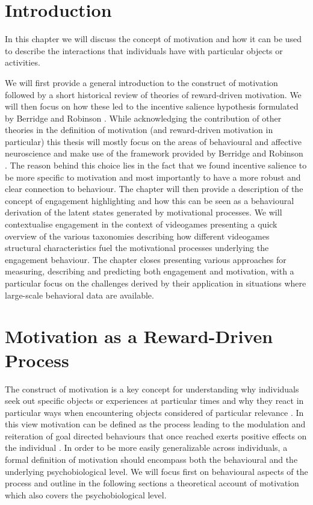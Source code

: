 \section{Introduction}
\label{motivation_engagement_introduction}
In this chapter we will discuss the concept of motivation and how it can be used to describe the interactions that individuals have with particular objects or activities. 

We will first provide a general introduction to the construct of motivation followed by a short historical review of theories of reward-driven motivation. We will then focus on how these led to the incentive salience hypothesis formulated by Berridge and Robinson \cite{berridge1998role}. While acknowledging the contribution of other theories in the definition of motivation (and reward-driven motivation in particular) this thesis will mostly focus on the areas of behavioural and affective neuroscience and make use of the framework provided by Berridge and Robinson \cite{berridge1998role}. The reason behind this choice lies in the fact that we found incentive salience to be more specific to motivation and most importantly to have a more robust and clear connection to behaviour. The chapter will then provide a description of the concept of engagement highlighting and how this can be seen as a behavioural derivation of the latent states generated by motivational processes. We will contextualise engagement in the context of videogames presenting a quick overview of the various taxonomies describing how different videogames structural characteristics fuel the motivational processes underlying the engagement behaviour. The chapter closes presenting various approaches for measuring, describing and predicting both engagement and motivation, with a particular focus on the challenges derived by their application in situations where large-scale behavioral data are available.

\section{Motivation as a Reward-Driven Process}
\label{motivation}
The construct of motivation is a key concept for understanding why individuals seek out specific objects or experiences at particular times and why they react in particular ways when encountering objects considered of particular relevance \cite{berridge2004motivation}. In this view motivation can be defined as the process leading to the modulation and reiteration of goal directed behaviours that once reached exerts positive effects on the individual \cite{simpson2016behavioral}. In order to be more easily generalizable across individuals, a formal definition of motivation should encompass both the behavioural and the underlying psychobiological level. We will focus first on behavioural aspects of the process and outline in the following sections a theoretical account of motivation which also covers the psychobiological level. 

